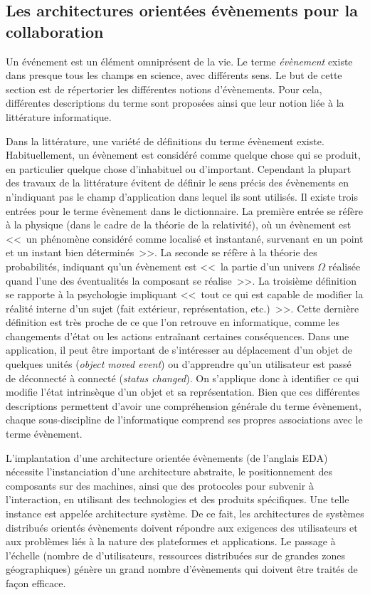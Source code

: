 \subsection{Les architectures orientées évènements pour la collaboration}

Un événement est un élément omniprésent de la vie. Le terme \textit{évènement} 
existe dans presque tous les champs en science, avec différents sens. Le but de 
cette section est de répertorier les différentes notions d'évènements. Pour cela, 
différentes descriptions du terme sont proposées ainsi que leur notion 
liée à la littérature informatique. 

Dans la littérature, une variété de définitions du terme évènement existe. 
Habituellement, un évènement est considéré comme quelque chose qui 
\og se produit\fg{}, en particulier quelque chose d'inhabituel ou d'important. 
Cependant la plupart des travaux de la littérature évitent de définir le sens précis 
des évènements en n'indiquant pas le champ d'application dans lequel ils sont 
utilisés. 
Il existe trois entrées pour le terme évènement dans le dictionnaire. 
La première entrée se réfère à la physique (dans le cadre de la théorie 
de la relativité), où un évènement est <<~un phénomène considéré comme localisé 
et instantané, survenant en un point et un instant bien déterminés~>>. La seconde 
se réfère à la théorie des probabilités, indiquant qu'un évènement est <<~la partie 
d'un univers $\Omega$ réalisée quand l'une des éventualités la composant se 
réalise~>>. La troisième définition se rapporte à la psychologie impliquant <<~tout 
ce qui est capable de modifier la réalité interne d'un sujet (fait extérieur, 
représentation, etc.)~>>. Cette dernière définition est très proche de ce que l'on 
retrouve en informatique, comme les changements d'état ou les actions entraînant 
certaines conséquences. Dans une application, il peut être important de 
s'intéresser au déplacement d'un objet de quelques unités (\textit{object moved 
	event}) ou d'apprendre qu'un utilisateur est passé de déconnecté à connecté 
(\textit{status changed}). On s'applique donc à identifier ce qui modifie l'état 
intrinsèque d'un objet et sa représentation. Bien que ces différentes descriptions 
permettent d'avoir une compréhension générale du terme évènement, chaque sous-discipline de l'informatique comprend 
ses propres associations avec le terme évènement.

L'implantation d'une architecture orientée évènements (de l'anglais \gls{EDA}) 
nécessite l'instanciation d'une 
architecture abstraite, 
le positionnement des composants sur des machines, ainsi que des protocoles 
pour subvenir à l'interaction, en utilisant des technologies et des produits 
spécifiques. Une telle instance est appelée architecture système. De ce fait, les 
architectures de systèmes distribués orientés évènements doivent 
répondre aux exigences des utilisateurs et aux problèmes liés à la nature des 
plateformes et applications. 
Le passage à l'échelle (nombre de d'utilisateurs, ressources distribuées sur de 
grandes zones géographiques) génère un grand nombre d'évènements qui doivent 
être traités de façon efficace. 

